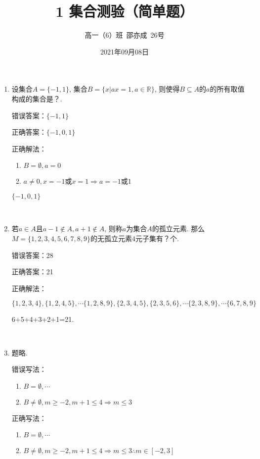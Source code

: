 \documentclass[8pt]{article}
\author{高一（6）班\ 邵亦成\ 26号}
\title{1 集合测验（简单题）}
\date{2021年09月08日}
\begin{document}
	\maketitle

	\begin{enumerate}
		
		\item
			设集合$A=\{-1,1\}$, 集合$B=\{x|ax=1, a\in \mathbb{R}\}$, 则使得$B \subseteq A$的$a$的所有取值构成的集合是？.

			错误答案：$\{-1,1\}$

			正确答案：$\{-1,0,1\}$

			正确解法：

			\begin{enumerate} [ (i) ]

				\item
					$B=\emptyset, a=0$

				\item
					$a\neq 0, x = -1$或$x = 1 \Rightarrow a = -1$或$1$

			\end{enumerate}

			$\{-1,0,1\}$

		~\\

		\item
			若$a\in A$且$a - 1 \notin A, a + 1 \notin A$, 则称$a$为集合$A$的孤立元素. 那么$M=\{1,2,3,4,5,6,7,8,9\}$的无孤立元素4元子集有？个.

			错误答案：28

			正确答案：21

			正确解法：

			$$
			\{1,2,3,4\}, \{1,2,4,5\}, \cdots \{1,2,8,9\}, \{2,3,4,5\}, \{2,3,5,6\}, \cdots \{2,3,8,9\}, \cdots \{6,7,8,9\}
			$$

			6+5+4+3+2+1=21.

		~\\

		\item
			题略.

			错误写法：

			\begin{enumerate} [ (1) ]

				\item
					$B=\emptyset, \cdots$

				\item
					$B\neq \emptyset, m \geq -2, m + 1 \leq 4 \Rightarrow m \leq 3$
			\end{enumerate}

			正确写法：

			\begin{enumerate} [ (1) ]

				\item
					$B=\emptyset, \cdots$

				\item
					$B\neq \emptyset, m \geq -2, m + 1 \leq 4 \Rightarrow m \leq 3 \therefore m \in [-2, 3]$
			\end{enumerate}

	\end{enumerate}
\end{document}
